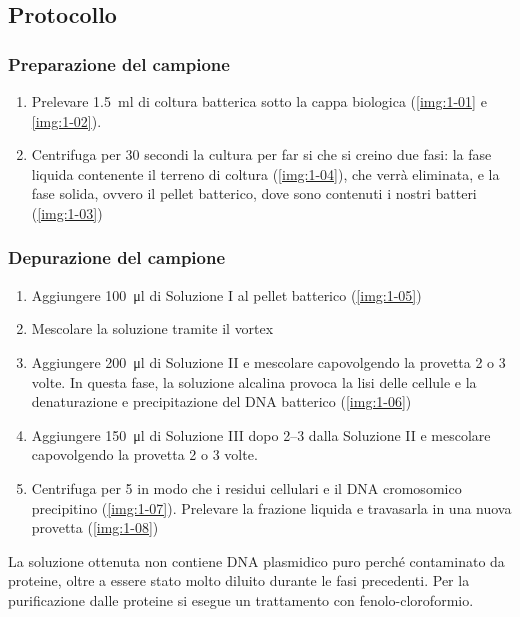 \subsection{Protocollo}
\subsubsection{Preparazione del campione}
\begin{enumerate}
	\item Prelevare \qty{1.5}{\ml} di coltura batterica sotto la cappa biologica (\autoref{img:1-01} e \ref{img:1-02}).          
	\item Centrifuga per 30 secondi la cultura per far si che si creino due fasi: la fase liquida contenente il terreno di coltura (\autoref{img:1-04}), che verrà eliminata, e la fase solida, ovvero il pellet batterico, dove sono contenuti i nostri batteri (\autoref{img:1-03})            
\end{enumerate}
\subsubsection{Depurazione del campione}
\begin{enumerate}
	\item Aggiungere \qty{100}{\micro\litre} di Soluzione I al pellet batterico (\autoref{img:1-05})
	\item Mescolare la soluzione tramite il \foreignlanguage{english}{vortex}
	\item Aggiungere \qty{200}{\micro\litre} di Soluzione II e mescolare capovolgendo la provetta 2 o 3 volte. In questa fase, la soluzione alcalina provoca la lisi delle cellule e la denaturazione e precipitazione del DNA batterico (\autoref{img:1-06})    
	\item Aggiungere \qty{150}{\micro\litre} di Soluzione III dopo \qtyrange{2}{3}{\min} dalla Soluzione II e mescolare capovolgendo la provetta 2 o 3 volte.    
	\item Centrifuga per \qty{5}{\min} in modo che i residui cellulari e il DNA cromosomico precipitino (\autoref{img:1-07}). Prelevare la frazione liquida e travasarla in una nuova provetta (\autoref{img:1-08})
\end{enumerate}
La soluzione ottenuta non contiene DNA plasmidico puro perché contaminato da proteine, oltre a essere stato molto diluito durante le fasi precedenti. Per la purificazione dalle proteine si esegue un trattamento con fenolo-cloroformio.
